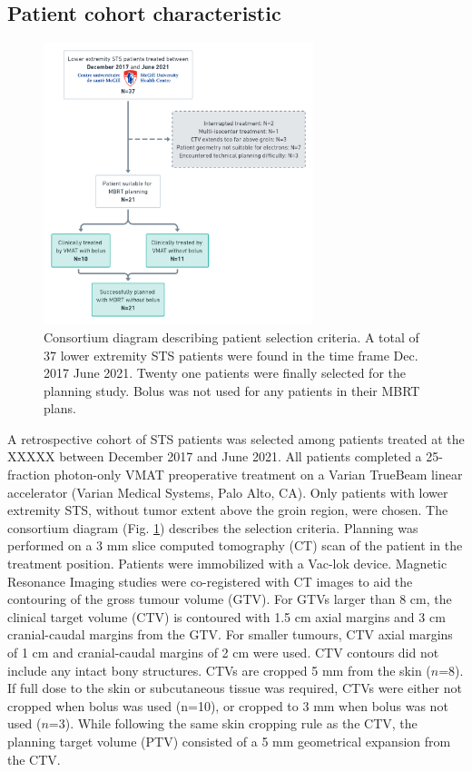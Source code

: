 \documentclass[aapm,graphicx,superscriptaddress]{revtex4-1}
\begin{document}
\subsection{Patient cohort characteristic}

\begin{figure}
    \centering
    \includegraphics[width=0.7\textwidth]{Consortium diagram.png}
    \caption{Consortium diagram describing patient selection criteria. A total of 37 lower extremity STS patients were found in the time frame Dec. 2017 June 2021. Twenty one patients were finally selected for the planning study. Bolus was not used for any patients in their MBRT plans.}
    \label{fig:consortium}
\end{figure}
A retrospective cohort of STS patients was selected among patients treated at the XXXXX %
between December 2017 and June 2021. All patients completed a 25-fraction photon-only VMAT preoperative treatment on a Varian TrueBeam linear accelerator (Varian Medical Systems, Palo
Alto, CA). Only patients with lower extremity STS, without tumor extent above the groin region, were chosen. The consortium diagram (Fig. \ref{fig:consortium}) describes the selection criteria. Planning was performed on a 3 mm slice computed tomography (CT) scan of the patient in the treatment position. Patients were immobilized with a Vac-lok device. Magnetic Resonance Imaging studies were co-registered with CT images to aid the contouring of the gross tumour volume (GTV). For GTVs larger than 8 cm, the clinical target volume (CTV) is contoured with 1.5 cm axial margins and 3 cm cranial-caudal margins from the GTV. For smaller tumours, CTV axial margins of 1 cm and cranial-caudal margins of 2 cm were used. CTV contours did not include any intact bony structures. CTVs are cropped 5 mm from the skin ($n$=8). If full dose to the skin or subcutaneous tissue was required, CTVs were either not cropped when bolus was used (n=10), or cropped to 3 mm when bolus was not used ($n$=3). While following the same skin cropping rule as the CTV, the planning target volume (PTV) consisted of a 5 mm geometrical expansion from the CTV.\\
\end{document}
